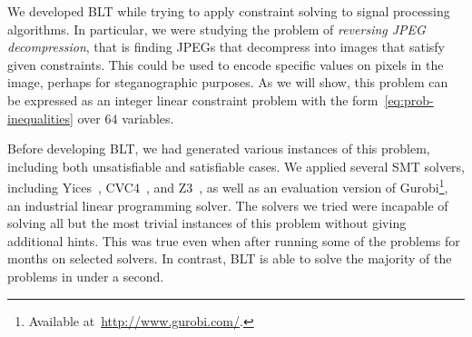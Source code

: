 We developed BLT while trying to apply constraint solving to signal
processing algorithms.  In particular, we were studying the problem of
\emph{reversing JPEG decompression}, that is finding JPEGs that decompress
into images that satisfy given constraints.  This could be used to encode
specific values on pixels in the image, perhaps for steganographic purposes.
As we will show, this problem can be expressed as an integer linear constraint
problem with the form~\eqref{eq:prob-inequalities} over $64$ variables.

Before developing BLT, we had generated various instances of this
problem, including both unsatisfiable and satisfiable cases.  We
applied several SMT solvers, including Yices~\cite{Dutertre:cav2014},
CVC4~\cite{DBLP:conf/cav/BarrettCDHJKRT11}, and
Z3~\cite{DeMoura:2008:ZES:1792734.1792766}, as well as an evaluation
version of Gurobi\footnote{Available
  at~\url{http://www.gurobi.com/}.}, an industrial linear programming
solver. The solvers we tried were incapable of solving
all but the most trivial instances of this problem without giving
additional hints. This was true even when after running some of the
problems for months on selected solvers.  In contrast, BLT is able to
solve the majority of the problems in under a second.


